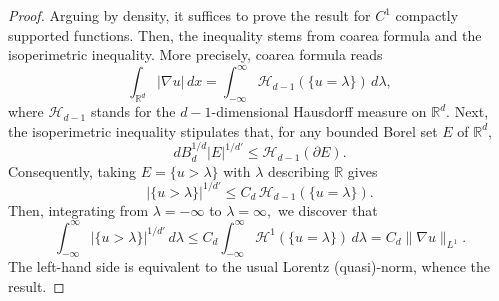 \documentclass[10pt,a4paper]{amsart}
\newcommand{\R}{{\mathbb R}}
\begin{document}
 \begin{proof} Arguing by density, it suffices to prove the result for $C^1$ compactly supported functions.
 Then,  the inequality stems from  coarea formula and the isoperimetric inequality. 
 More precisely, coarea formula reads 
   \[
   \int_{\mathbb{R}^d} |\nabla u| \, dx = \int_{-\infty}^\infty \mathcal{H}_{d-1}(\{u = \lambda\}) \, d\lambda,
   \]
   where  \(\mathcal{H}_{d-1}\) stands for the $d-1$-dimensional  Hausdorff measure on $\R^d.$
   \medbreak
   Next, the isoperimetric inequality stipulates that, for any bounded Borel set $E$ of $\R^d,$  
     \[ d  B_d^{1/d} |E|^{1/d'} \leq  \mathcal{H}_{d-1}(\partial E).\]
 Consequently, taking  \(E= \{u > \lambda\}\) with $\lambda$ describing $\R$ gives
   \[   |\{u > \lambda\}|^{1/d'} \leq C_d \, \mathcal{H}_{d-1}(\{u = \lambda\}).\]
   Then, integrating from $\lambda=-\infty$ to $\lambda=\infty,$ we discover that
   \[\int_{-\infty}^\infty |\{u > \lambda\}|^{1/d'} \, d\lambda \leq C_d\int_{-\infty}^\infty    \mathcal{H}^1(\{u = \lambda\}) \, d\lambda=C_d\|\nabla u\|_{L^1}. \]
   The left-hand side is equivalent to the usual 
   Lorentz (quasi)-norm, whence the result. 
 \end{proof}
\end{document}
